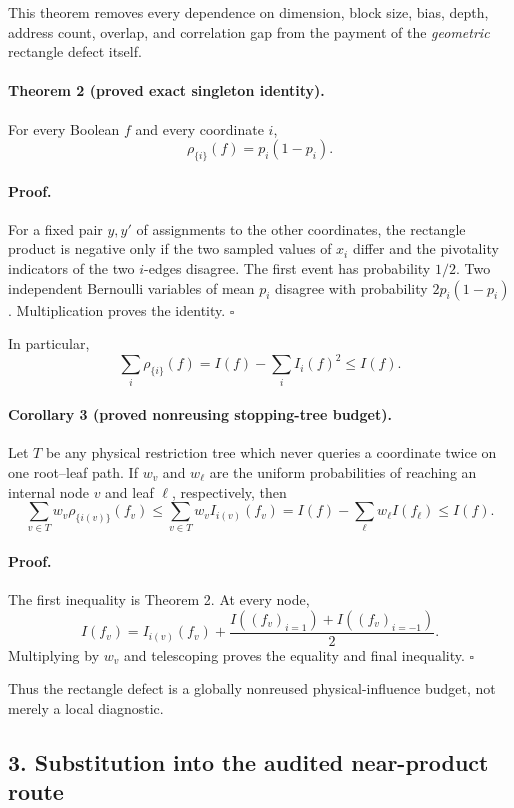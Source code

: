 This theorem removes every dependence on dimension, block size, bias, depth,
address count, overlap, and correlation gap from the payment of the
\emph{geometric} rectangle defect itself.

\paragraph{Theorem 2 (proved exact singleton identity).}
For every Boolean $f$ and every coordinate $i$,
\[
 \boxed{\rho_{\{i\}}(f)=p_i(1-p_i).}
\]

\paragraph{Proof.}
For a fixed pair $y,y'$ of assignments to the other coordinates, the
rectangle product is negative only if the two sampled values of $x_i$ differ
and the pivotality indicators of the two $i$-edges disagree.  The first event
has probability $1/2$.  Two independent Bernoulli variables of mean $p_i$
disagree with probability $2p_i(1-p_i)$.  Multiplication proves the identity.
\hfill$\square$

In particular,
\[
 \sum_i\rho_{\{i\}}(f)=I(f)-\sum_i I_i(f)^2\le I(f).
\]

\paragraph{Corollary 3 (proved nonreusing stopping-tree budget).}
Let $T$ be any physical restriction tree which never queries a coordinate
twice on one root--leaf path.  If $w_v$ and $w_\ell$ are the uniform
probabilities of reaching an internal node $v$ and leaf $\ell$, respectively,
then
\[
 \sum_{v\in T}w_v\rho_{\{i(v)\}}(f_v)
 \le \sum_{v\in T}w_v I_{i(v)}(f_v)
 =I(f)-\sum_{\ell}w_\ell I(f_\ell)
 \le I(f).
\]

\paragraph{Proof.}
The first inequality is Theorem 2.  At every node,
\[
 I(f_v)=I_{i(v)}(f_v)+\frac{I((f_v)_{i=1})+I((f_v)_{i=-1})}{2}.
\]
Multiplying by $w_v$ and telescoping proves the equality and final inequality.
\hfill$\square$

Thus the rectangle defect is a globally nonreused physical-influence budget,
not merely a local diagnostic.

\subsection*{3. Substitution into the audited near-product route}

